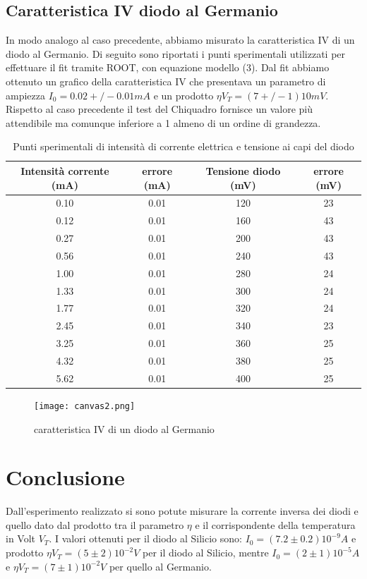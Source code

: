 \documentclass{article}
\begin{document}
\subsection{Caratteristica IV diodo al Germanio}
In modo analogo al caso precedente, abbiamo misurato la caratteristica IV di un diodo al Germanio. Di seguito sono riportati i punti sperimentali utilizzati per effettuare il fit tramite ROOT, con equazione modello (3). Dal fit abbiamo ottenuto un grafico della caratteristica IV che presentava un parametro di ampiezza \(I_0 =0.02+/-0.01 mA\) e un prodotto \(\eta V_T=(7+/-1)10mV\). Rispetto al caso precedente il test del Chiquadro fornisce un valore più attendibile ma comunque inferiore a 1 almeno di un ordine di grandezza.
\begin{table}[]
    \centering
    \begin{tabular}{||c|c|c|c||}
    \hline
    Intensità corrente (mA) & errore (mA) & Tensione diodo (mV) & errore (mV) \\
    \hline\hline
    0.10 & 0.01 & 120 & 23 \\
    0.12 & 0.01 & 160 & 43 \\
    0.27 & 0.01 & 200 & 43 \\
    0.56 & 0.01 & 240 & 43 \\
    1.00 & 0.01 & 280 & 24 \\
    1.33 & 0.01 & 300 & 24 \\
    1.77 & 0.01 & 320 & 24 \\
    2.45 & 0.01 & 340 & 23 \\
    3.25 & 0.01 & 360 & 25 \\
    4.32 & 0.01 & 380 & 25 \\
    5.62 & 0.01 & 400 & 25 \\
    \hline
    \end{tabular}
    \caption{Punti sperimentali di intensità di corrente elettrica e tensione ai capi del diodo}
    \label{tab:my_label}
\end{table}
\quad
\begin{figure}
    \centering
    \texttt{[image: canvas2.png]}
    \caption{caratteristica IV di un diodo al Germanio}
    \label{fig:my_label}
\end{figure}
\section{Conclusione}
Dall’esperimento realizzato si sono potute misurare la corrente inversa dei diodi e quello dato dal prodotto tra il parametro  \(\eta\) e il corrispondente della temperatura in Volt \(V_T\). I valori ottenuti per il diodo al Silicio sono: \(I_0=(7.2 \pm 0.2)10^{-9}A\) e prodotto \(\eta V_T =(5 \pm 2)10^{-2}V\) per il diodo al Silicio, mentre \(I_0=(2\pm1)10^{-5}A\) e \(\eta V_T=(7 \pm 1)10^{-2}V\) per quello al Germanio. 
\end{document}
